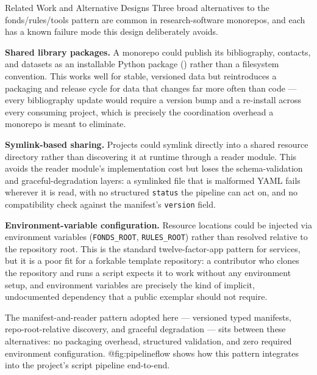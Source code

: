 \documentclass[
  ignorenonframetext,
]{beamer}
\begin{document}
\begin{frame}{Related Work and Alternative
Designs}
\protect{}\label{related-work-and-alternative-designs}
Three broad alternatives to the fonds/rules/tools pattern are common in
research-software monorepos, and each has a known failure mode this
design deliberately avoids.

\textbf{Shared library packages.} A monorepo could publish its
bibliography, contacts, and datasets as an installable Python package
() rather than a filesystem
convention. This works well for stable, versioned data but reintroduces
a packaging and release cycle for data that changes far more often than
code --- every bibliography update would require a version bump and a
re-install across every consuming project, which is precisely the
coordination overhead a monorepo is meant to eliminate.

\textbf{Symlink-based sharing.} Projects could symlink directly into a
shared resource directory rather than discovering it at runtime through
a reader module. This avoids the reader module's implementation cost but
loses the schema-validation and graceful-degradation layers: a symlinked
file that is malformed YAML fails wherever it is read, with no
structured \texttt{status} the pipeline can act on, and no compatibility
check against the manifest's \texttt{version} field.

\textbf{Environment-variable configuration.} Resource locations could be
injected via environment variables (\texttt{FONDS\_ROOT},
\texttt{RULES\_ROOT}) rather than resolved relative to the repository
root. This is the standard twelve-factor-app pattern for services, but
it is a poor fit for a forkable template repository: a contributor who
clones the repository and runs a script expects it to work without any
environment setup, and environment variables are precisely the kind of
implicit, undocumented dependency that a public exemplar should not
require.

The manifest-and-reader pattern adopted here --- versioned typed
manifests, repo-root-relative discovery, and graceful degradation ---
sits between these alternatives: no packaging overhead, structured
validation, and zero required environment configuration.
@fig:pipelineflow shows how this pattern integrates into the project's
script pipeline end-to-end.
\end{frame}
\end{document}
